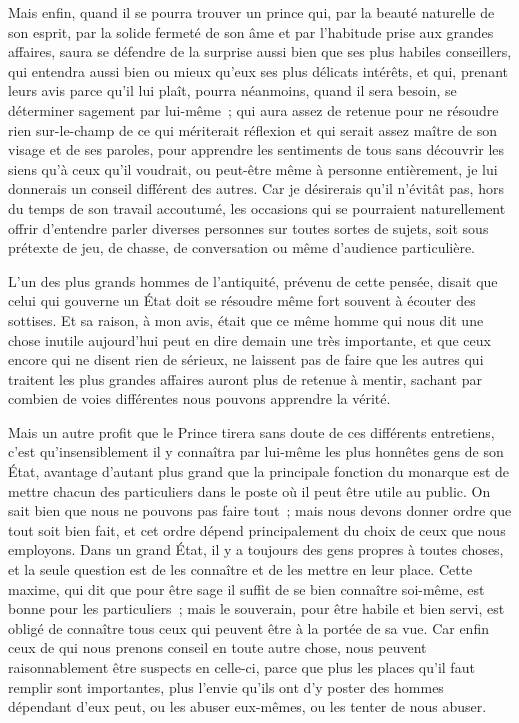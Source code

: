 \documentclass[french,twoside]{book} %
\begin{document}
Mais enfin, quand il se pourra trouver un prince qui, par la beauté naturelle de son esprit, par la solide fermeté de son âme et par l’habitude prise aux grandes affaires, saura se défendre de la surprise aussi bien que ses plus habiles conseillers, qui entendra aussi bien ou mieux qu’eux ses plus délicats intérêts, et qui, prenant leurs avis parce qu’il lui plaît, pourra néanmoins, quand il sera besoin, se déterminer sagement par lui-même ; qui aura assez de retenue pour ne résoudre rien sur-le-champ de ce qui mériterait réflexion et qui serait assez maître de son visage et de ses paroles, pour apprendre les sentiments de tous sans découvrir les siens qu’à ceux qu’il voudrait, ou peut-être même à personne entièrement, je lui donnerais un conseil différent des autres. Car je désirerais qu’il n’évitât pas, hors du temps de son travail accoutumé, les occasions qui se pourraient naturellement offrir d’entendre parler diverses personnes sur toutes sortes de sujets, soit sous prétexte de jeu, de chasse, de conversation ou même d’audience particulière.\par
L’un des plus grands hommes de l’antiquité, prévenu de cette pensée, disait que celui qui gouverne un État doit se résoudre même fort souvent à écouter des sottises. Et sa raison, à mon avis, était que ce même homme qui nous dit une chose inutile aujourd’hui peut en dire demain une très importante, et que ceux encore qui ne disent rien de sérieux, ne laissent pas de faire que les autres qui traitent les plus grandes affaires auront plus de retenue à mentir, sachant par combien de voies différentes nous pouvons apprendre la vérité.\par
Mais un autre profit que le Prince tirera sans doute de ces différents entretiens, c’est qu’insensiblement il y connaîtra par lui-même les plus honnêtes gens de son État, avantage d’autant plus grand que la principale fonction du monarque est de mettre chacun des particuliers dans le poste où il peut être utile au public. On sait bien que nous ne pouvons pas faire tout ; mais nous devons donner ordre que tout soit bien fait, et cet ordre dépend principalement du choix de ceux que nous employons. Dans un grand État, il y a toujours des gens propres à toutes choses, et la seule question est de les connaître et de les mettre en leur place. Cette maxime, qui dit que pour être sage il suffit de se bien connaître soi-même, est bonne pour les particuliers ; mais le souverain, pour être habile et bien servi, est obligé de connaître tous ceux qui peuvent être à la portée de sa vue. Car enfin ceux de qui nous prenons conseil en toute autre chose, nous peuvent raisonnablement être suspects en celle-ci, parce que plus les places qu’il faut remplir sont importantes, plus l’envie qu’ils ont d’y poster des hommes dépendant d’eux peut, ou les abuser eux-mêmes, ou les tenter de nous abuser.\par
\end{document}
